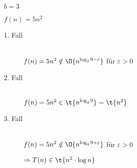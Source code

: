 \documentclass{lehramt-informatik-aufgabe}
\begin{document}
\begin{enumerate}
\begin{liAntwort}
$b = 3$

$f(n) = 5n^2$

\begin{description}

\item[1. Fall] \strut\\
$f(n) = 5n^2 \notin \O{n^{\log_3 {9 - \varepsilon}}}$ für $\varepsilon > 0$

\item[2. Fall] \strut\\
$f(n) = 5n^2 \in \t{n^{\log_3 {9}}} = \t{n^2}$

\item[3. Fall] \strut\\
$f(n) = 5n^2 \notin \O{n^{\log_3 {9 + \varepsilon}}}$ für $\varepsilon > 0$

$\Rightarrow T(n) \in \t{n^2 \cdot \log n}$
\end{description}

\end{liAntwort}

\end{enumerate}
\end{document}
